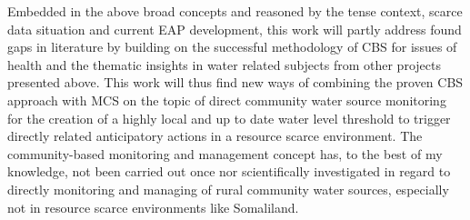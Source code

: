 Embedded in the above broad concepts and reasoned by the tense context, scarce data situation and current EAP development, this work will partly address found gaps in literature by building on the successful methodology of CBS for issues of health and the thematic insights in water related subjects from other projects presented above. This work will thus find new ways of combining the proven CBS approach with MCS on the topic of direct community water source monitoring for the creation of a highly local and up to date water level threshold to trigger directly related anticipatory actions in a resource scarce environment.
The community-based monitoring and management concept has, to the best of my knowledge, not been carried out once nor scientifically investigated in regard to directly monitoring and managing of rural community water sources, especially not in resource scarce environments like Somaliland.


